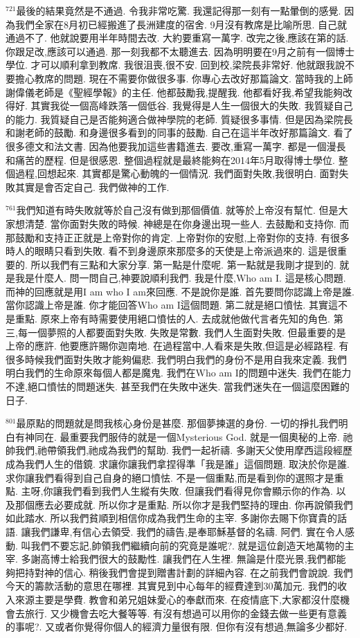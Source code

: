 \documentclass{book}
\begin{document}
$^{721}$最後的結果竟然是不通過.
令我非常吃驚.
我還記得那一刻有一點暈倒的感覺.
因為我們全家在8月初已經搬進了長洲建度的宿舍.
9月沒有教席是比喻所思.
自己就通過不了.
他就說要用半年時間去改.
大約要重寫一萬字.
改完之後,應該在第的話.
你跟足改,應該可以通過.
那一刻我都不太聽進去.
因為明明要在9月之前有一個博士學位.
才可以順利拿到教席.
我很沮喪,很不安.
回到校,梁院長非常好.
他就跟我說不要擔心教席的問題.
現在不需要你做很多事.
你專心去改好那篇論文.
當時我的上師謝偉儀老師是《聖經學報》的主任.
他都鼓勵我,提醒我.
他都看好我,希望我能夠改得好.
其實我從一個高峰跌落一個低谷.
我覺得是人生一個很大的失敗.
我質疑自己的能力.
我質疑自己是否能夠適合做神學院的老師.
質疑很多事情.
但是因為梁院長和謝老師的鼓勵.
和身邊很多看到的同事的鼓勵.
自己在這半年改好那篇論文.
看了很多德文和法文書.
因為他要我加這些書籍進去.
要改,重寫一萬字.
都是一個漫長和痛苦的歷程.
但是很感恩.
整個過程就是最終能夠在2014年5月取得博士學位.
整個過程,回想起來.
其實都是驚心動魄的一個情況.
我們面對失敗,我很明白.
面對失敗其實是會否定自己.
我們做神的工作.

$^{761}$我們知道有時失敗就等於自己沒有做到那個價值.
就等於上帝沒有幫忙.
但是大家想清楚.
當你面對失敗的時候.
神總是在你身邊出現一些人.
去鼓勵和支持你.
而那鼓勵和支持正正就是上帝對你的肯定.
上帝對你的安慰,上帝對你的支持.
有很多時人的眼睛只看到失敗.
看不到身邊原來那麼多的天使是上帝派過來的.
這是很重要的.
所以我們有三點和大家分享.
第一點是什麼呢.
第一點就是我剛才提到的.
就是我是什麼人.
問一問自己,神要說順利我們.
我是什麼,Who am I.
這是核心問題.
而神的回應就是用I am who I am來回應.
不是說你是誰.
首先要問你認識上帝是誰.
當你認識上帝是誰.
你才能回答Who am I這個問題.
第二就是絕口憤怯.
其實這不是重點.
原來上帝有時需要使用絕口憤怯的人.
去成就他做代言者先知的角色.
第三,每一個夢照的人都要面對失敗.
失敗是常數.
我們人生面對失敗.
但最重要的是上帝的應許.
他要應許賜你迦南地.
在過程當中,人看來是失敗,但這是必經路程.
有很多時候我們面對失敗才能夠偏悲.
我們明白我們的身份不是用自我來定義.
我們明白我們的生命原來每個人都是魔鬼.
我們在Who am I的問題中迷失.
我們在能力不達,絕口憤怯的問題迷失.
甚至我們在失敗中迷失.
當我們迷失在一個這麼困難的日子.

$^{801}$最原點的問題就是問我核心身份是甚麼.
那個夢揀選的身份.
一切的掙扎我們明白有神同在.
最重要我們服侍的就是一個Mysterious God.
就是一個奧秘的上帝.
祂帥我們,祂帶領我們,祂成為我們的幫助.
我們一起祈禱.
多謝天父使用摩西這段經歷成為我們人生的借鏡.
求讓你讓我們拿捏得準「我是誰」這個問題.
取決於你是誰.
求你讓我們看得到自己自身的絕口憤怯.
不是一個重點,而是看到你的選照才是重點.
主呀,你讓我們看到我們人生縱有失敗.
但讓我們看得見你會顯示你的作為.
以及那個應去必要成就.
所以你才是重點.
所以你才是我們堅持的理由.
你再說領我們如此踏水.
所以我們貧順到相信你成為我們生命的主宰.
多謝你去賜下你寶貴的話語.
讓我們謙卑,有信心去領受.
我們的禱告,是奉耶穌基督的名禱.
阿們.
實在令人感動.
叫我們不要忘記,帥領我們繼續向前的究竟是誰呢?.
就是這位創造天地萬物的主宰.
多謝高博士給我們很大的鼓勵性.
讓我們在人生裡.
無論是什麼光景,我們都能夠把持對神的信心.
稍後我們會提到贈書計劃的詳細內容.
在之前我們會說說.
我們今天的籌款活動的意思在哪裡.
其實見到中心每年的經費達到30萬加元.
我們的收入來源主要是學費.
教會和弟兄姐妹愛心的奉獻而來.
在疫情底下,大家都沒什麼機會去旅行.
又少機會去吃大餐等等.
有沒有想過可以用你的金錢去做一些更有意義的事呢?.
又或者你覺得你個人的經濟力量很有限.
但你有沒有想過,無論多少都好.
\end{document}
